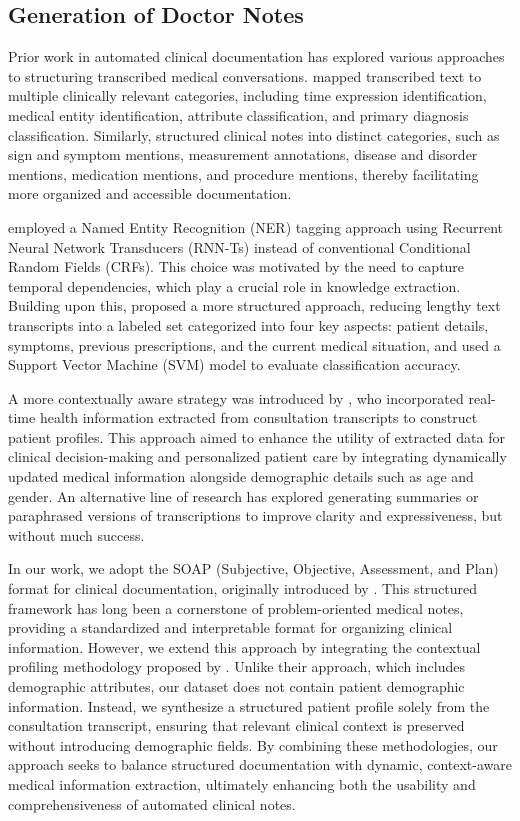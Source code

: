 \documentclass[11pt,a4paper]{article}
\begin{document}
\subsection*{Generation of Doctor Notes}
Prior work in automated clinical documentation has explored various approaches to structuring transcribed medical conversations. \cite{wenceslao} mapped transcribed text to multiple clinically relevant categories, including time expression identification, medical entity identification, attribute classification, and primary diagnosis classification. Similarly, \cite{khattak} structured clinical notes into distinct categories, such as sign and symptom mentions, measurement annotations, disease and disorder mentions, medication mentions, and procedure mentions, thereby facilitating more organized and accessible documentation. 

\cite{understandingmedicalconvo} employed a Named Entity Recognition (NER) tagging approach using Recurrent Neural Network Transducers (RNN-Ts) instead of conventional Conditional Random Fields (CRFs). This choice was motivated by the need to capture temporal dependencies, which play a crucial role in knowledge extraction. 
Building upon this, \cite{dlbasedtranscribing} proposed a more structured approach, reducing lengthy text transcripts into a labeled set categorized into four key aspects: patient details, symptoms, previous prescriptions, and the current medical situation, and used a Support Vector Machine (SVM) model to evaluate classification accuracy.

A more contextually aware strategy was introduced by \cite{contextagg}, who incorporated real-time health information extracted from consultation transcripts to construct patient profiles. This approach aimed to enhance the utility of extracted data for clinical decision-making and personalized patient care by integrating dynamically updated medical information alongside demographic details such as age and gender. An alternative line of research has explored generating summaries or paraphrased versions of transcriptions to improve clarity and expressiveness, but without much success.

In our work, we adopt the SOAP (Subjective, Objective, Assessment, and Plan) format for clinical documentation, originally introduced by \cite{SOAP}. This structured framework has long been a cornerstone of problem-oriented medical notes, providing a standardized and interpretable format for organizing clinical information. However, we extend this approach by integrating the contextual profiling methodology proposed by \cite{contextagg}. Unlike their approach, which includes demographic attributes, our dataset does not contain patient demographic information. Instead, we synthesize a structured patient profile solely from the consultation transcript, ensuring that relevant clinical context is preserved without introducing demographic fields. By combining these methodologies, our approach seeks to balance structured documentation with dynamic, context-aware medical information extraction, ultimately enhancing both the usability and comprehensiveness of automated clinical notes.
\end{document}
